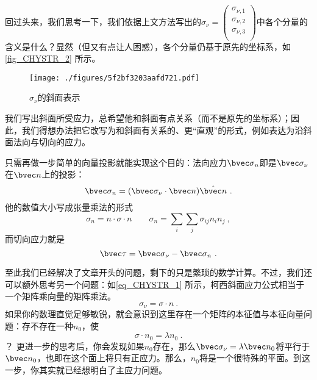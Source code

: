 回过头来，我们思考一下，我们依据上文方法写出的$\sigma_\nu=
\begin{pmatrix}
\sigma_{\nu,1}\\
\sigma_{\nu,2}\\
\sigma_{\nu,3}\\
\end{pmatrix}$中各个分量的含义是什么？显然（但又有点让人困惑），各个分量仍基于原先的坐标系，如\autoref{fig_CHYSTR_2} 所示。

\begin{figure}[ht]
\centering
\texttt{[image: ./figures/5f2bf3203aafd721.pdf]}
\caption{$\sigma_\nu$的斜面表示} \label{fig_CHYSTR_3}
\end{figure}

我们写出斜面所受应力，总希望他和斜面有点关系（而不是原先的坐标系）；因此，我们得想办法把它改写为和斜面有关系的、更“直观”的形式，例如表达为沿斜面法向与切向的应力。

只需再做一步简单的向量投影就能实现这个目的：法向应力$\bvec \sigma_n$即是$\bvec \sigma_\nu$在$\bvec n$上的投影：
\begin{equation}
\bvec \sigma_n = (\bvec \sigma_\nu \cdot \bvec n)  \hat{\bvec n}~.
\end{equation}
他的数值大小写成张量乘法的形式
\begin{equation}
\sigma_n = n \cdot \sigma \cdot n 
\qquad \sigma_n =\sum_i \sum_j \sigma_{ij} n_i n_j~,
\end{equation}
而切向应力就是
\begin{equation}
\bvec \tau = \bvec \sigma_\nu - \bvec \sigma_n~.
\end{equation}

至此我们已经解决了文章开头的问题，剩下的只是繁琐的数学计算。不过，我们还可以额外思考另一个问题：如\autoref{eq_CHYSTR_1} 所示，柯西斜面应力公式相当于一个矩阵乘向量的矩阵乘法。
$$\sigma_\nu = \sigma \cdot n~.$$
如果你的数理直觉足够敏锐，就会意识到这里存在一个矩阵的本征值与本征向量问题：存不存在一种$n_0$，使
$$
\sigma \cdot n_0 = \lambda n_0~.
$$？
更进一步的思考后，你会发现如果$n_0$存在，那么$\bvec \sigma_\nu = \lambda \bvec n_0$将平行于$\bvec n_0$，也即在这个面上将只有正应力。那么，$n_0$将是一个很特殊的平面。到这一步，你其实就已经想明白了主应力问题。

